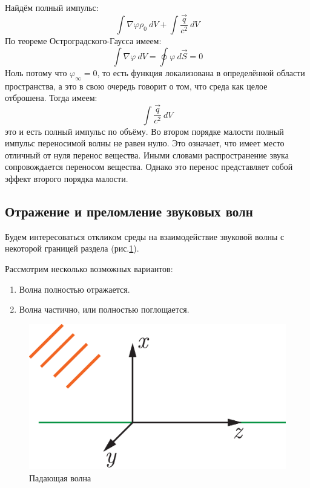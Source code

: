 \documentclass[14pt,a4paper,oneside]{extarticle}	%
\begin{document}
Найдём полный импульс:
\begin{equation*}
\int \nabla\varphi \rho_{0}\:dV + \int \frac{\vec{q}}{c^{2}}\:dV
\end{equation*}
По теореме Остроградского-Гаусса имеем:
\begin{equation*}
\int \nabla\varphi\:dV = \oint \varphi \:d \vec{S}=0 
\end{equation*}
Ноль потому что $ \varphi_{\infty} = 0 $, то есть функция локализована в определённой области пространства, а это в свою очередь говорит о том, что среда как целое отброшена.
Тогда имеем: 
\begin{equation*}
\int \frac{\vec{q}}{c^{2}}\:dV
\end{equation*}
это и есть полный импульс по объёму.
Во втором порядке малости полный импульс переносимой волны не равен нулю.
Это означает, что имеет место отличный от нуля перенос вещества. Иными словами распространение звука сопровождается переносом вещества. Однако это перенос представляет собой эффект второго порядка малости.

\newpage
\begin{center}
	\subsection*{Отражение и преломление звуковых волн} %
\end{center}
 Будем интересоваться откликом среды на взаимодействие звуковой волны с некоторой границей раздела (рис.\ref{fig::3}).
 
 Рассмотрим несколько возможных вариантов:
 \begin{enumerate}
 	\item Волна полностью отражается.
 	\item Волна частично, или полностью поглощается.
 \end{enumerate}

\begin{figure}[h!] 	%
	\centering 		%
	\includegraphics[width=12cm]{3.eps} %
	\caption{Падающая волна}
	\label{fig::3}
\end{figure}
\end{document}
